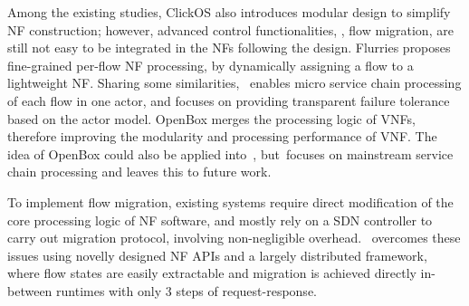 Among the existing studies, ClickOS  \cite{martins2014clickos} %
also introduces modular design to simplify NF construction; however, advanced control functionalities, \eg, flow migration, are still not easy to be integrated in the NFs following the design.
Flurries \cite{zhang2016flurries} proposes fine-grained per-flow NF processing, by dynamically assigning a flow to a lightweight NF. Sharing some similarities, \nfactor~enables micro service chain processing of each flow in one actor, and focuses on providing transparent failure tolerance based on the actor model. OpenBox merges the processing logic of VNFs, therefore improving the modularity and processing performance of VNF. The idea of OpenBox could also be applied into~\nfactor, but~\nfactor focuses on mainstream service chain processing and leaves this to future work.

To implement flow migration, existing systems \cite{gember2015opennf}\cite{rajagopalan2013split} require direct modification of the core processing logic of NF software, and mostly rely on a SDN controller to carry out migration protocol, involving non-negligible overhead. %
\nfactor~overcomes these issues using novelly designed NF APIs and a largely distributed framework, where flow states are easily extractable and migration is achieved directly in-between runtimes with only 3 steps of request-response. %

